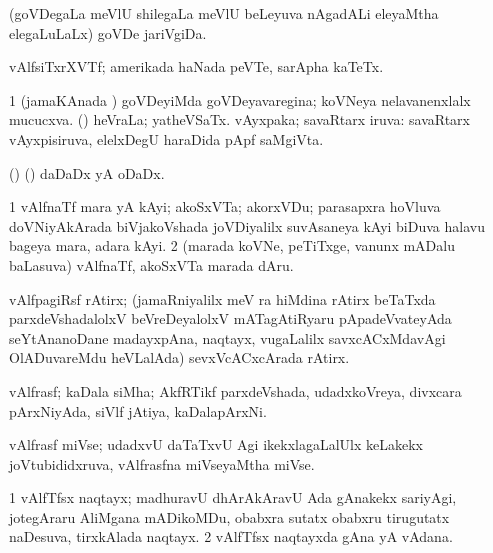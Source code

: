 \bentry
{} 
\gl{\nA}
\expl{}
\bmng
(goVDegaLa meVlU shilegaLa meVlU beLeyuva nAgadALi eleyaMtha elegaLuLaLx) goVDe jariVgiDa. 
\emng
\eentry

\bentry
{} 
\gl{\nA}
\expl{}
\bmng
vAlfsiTxrXVTf; amerikada haNada peVTe, sarApha kaTeTx. 
\emng
\eentry

\bentry 
{} 
\gl{\gu}
\expl{}
\bmng
\bnum
\num{1} (jamaKAnada \vi) goVDeyiMda goVDeyavaregina; koVNeya nelavanenxlalx mucucxva. 
 (\AmA) 
\banum
{} heVraLa; yatheVSaTx. 
 vAyxpaka; savaRtarx iruva:  savaRtarx vAyxpisiruva, elelxDegU haraDida pApf saMgiVta. 
\eanum
\numie
\enum
\emng
\eentry

\bentry
{} 
\gl{\nA}
\bmng
(\birx) (\ashi) daDaDx yA oDaDx. 
\emng
\eentry

\bentry
{} 
\gl{\nA}
\bmng
\bnum
\num{1} vAlfnaTf mara yA kAyi; akoSxVTa; akorxVDu; parasapxra hoVluva doVNiyAkArada biVjakoVshada joVDiyalilx suvAsaneya kAyi biDuva halavu bageya mara, adara kAyi. 
\num{2} (marada koVNe, peTiTxge, \mo vanunx mADalu baLasuva) vAlfnaTf, akoSxVTa marada dAru. 
\enum
\emng
\eentry

\bentry
{} 
\gl{\nA}
\expl{}
\bmng
vAlfpagiRsf rAtirx; (jamaRniyalilx meV ra hiMdina rAtirx beTaTxda parxdeVshadalolxV beVreDeyalolxV mATagAtiRyaru pApadeVvateyAda seYtAnanoDane madayxpAna, naqtayx, \mo vugaLalilx savxcACxMdavAgi OlADuvareMdu heVLalAda) sevxVcACxcArada rAtirx. 
\emng
\eentry

\bentry
{} 
\gl{\nA}
\bmng
vAlfrasf; kaDala siMha; AkfRTikf parxdeVshada, udadxkoVreya, divxcara pArxNiyAda, siVlf jAtiya, kaDalapArxNi.  
\emng
\eentry

\bentry
{} 
\gl{\nA}
\expl{}
\bmng
vAlfrasf miVse; udadxvU daTaTxvU Agi ikekxlagaLalUlx keLakekx joVtubididxruva, vAlfrasfna miVseyaMtha miVse. 
\emng
\eentry

\bentry
{} 
\gl{\nA}
\expl{}
\bmng
\bnum
\num{1} vAlfTfsx naqtayx; madhuravU dhArAkAravU Ada gAnakekx sariyAgi, jotegAraru AliMgana mADikoMDu, obabxra sutatx obabxru tirugutatx naDesuva, tirxkAlada naqtayx. 
\num{2} vAlfTfsx naqtayxda gAna yA vAdana. 
\enum
\emng
\eentry

